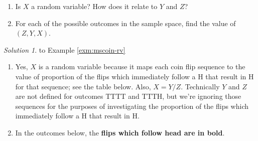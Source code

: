 \documentclass[
]{book}
\providecommand{\tightlist}{%
  \setlength{\itemsep}{0pt}\setlength{\parskip}{0pt}}
\theoremstyle{definition}
\theoremstyle{definition}
\theoremstyle{definition}
\theoremstyle{remark}
\newtheorem*{solution}{Solution}
\begin{document}
\begin{enumerate}
\def\labelenumi{\arabic{enumi}.}
\tightlist
\item
  Is \(X\) a random variable? How does it relate to \(Y\) and \(Z\)?
\item
  For each of the possible outcomes in the sample space, find the value of \((Z, Y, X)\).
\end{enumerate}

\begin{solution}
{}to Example \ref{exm:mscoin-rv}
\end{solution}

\begin{enumerate}
\def\labelenumi{\arabic{enumi}.}
\tightlist
\item
  Yes, \(X\) is a random variable because it maps each coin flip sequence to the value of proportion of the flips which immediately follow a H that result in H for that sequence; see the table below. Also, \(X=Y/Z\). Technically \(Y\) and \(Z\) are not defined for outcomes TTTT and TTTH, but we're ignoring those sequences for the purposes of investigating the proportion of the flips which immediately follow a H that result in H.
\item
  In the outcomes below, the \textbf{flips which follow head are in bold}.
\end{enumerate}
\end{document}
